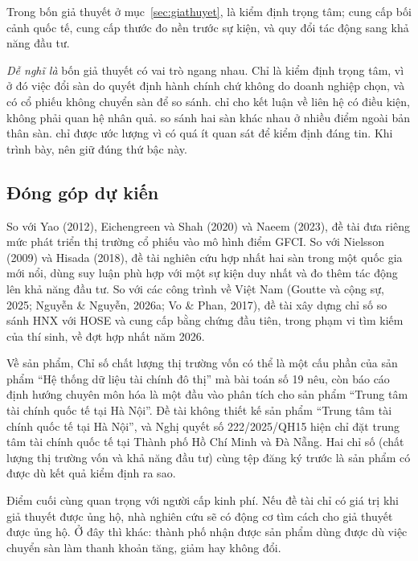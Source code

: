 Trong bốn giả thuyết ở mục~\ref{sec:giathuyet},  là kiểm định trọng tâm;  cung cấp bối cảnh quốc tế,  cung cấp thước đo nền trước sự kiện, và  quy đổi tác động sang khả năng đầu tư.

\begin{delam}
\emph{Dễ nghĩ là} bốn giả thuyết có vai trò ngang nhau. Chỉ  là kiểm định trọng tâm, vì ở đó việc đổi sàn do quyết định hành chính chứ không do doanh nghiệp chọn, và có cổ phiếu không chuyển sàn để so sánh.  chỉ cho kết luận về liên hệ có điều kiện, không phải quan hệ nhân quả.  so sánh hai sàn khác nhau ở nhiều điểm ngoài bản thân sàn.  chỉ được ước lượng vì có quá ít quan sát để kiểm định đáng tin. Khi trình bày, nên giữ đúng thứ bậc này.
\end{delam}

\subsection*{Đóng góp dự kiến}

So với Yao (2012), Eichengreen và Shah (2020) và Naeem (2023), đề tài đưa riêng mức phát triển thị trường cổ phiếu vào mô hình điểm GFCI. So với Nielsson (2009) và Hisada (2018), đề tài nghiên cứu hợp nhất hai sàn trong một quốc gia mới nổi, dùng suy luận phù hợp với một sự kiện duy nhất và đo thêm tác động lên khả năng đầu tư. So với các công trình về Việt Nam (Goutte và cộng sự, 2025; Nguyễn \& Nguyễn, 2026a; Vo \& Phan, 2017), đề tài xây dựng chỉ số so sánh HNX với HOSE và cung cấp bằng chứng đầu tiên, trong phạm vi tìm kiếm của thí sinh, về đợt hợp nhất năm 2026.

Về sản phẩm, Chỉ số chất lượng thị trường vốn có thể là một cấu phần của sản phẩm \enquote{Hệ thống dữ liệu tài chính đô thị} mà bài toán số 19 nêu, còn báo cáo định hướng chuyên môn hóa là một đầu vào phân tích cho sản phẩm \enquote{Trung tâm tài chính quốc tế tại Hà Nội}. Đề tài không thiết kế sản phẩm \enquote{Trung tâm tài chính quốc tế tại Hà Nội}, và Nghị quyết số 222/2025/QH15 hiện chỉ đặt trung tâm tài chính quốc tế tại Thành phố Hồ Chí Minh và Đà Nẵng. Hai chỉ số (chất lượng thị trường vốn và khả năng đầu tư) cùng tệp đăng ký trước là sản phẩm có được dù kết quả kiểm định ra sao.

Điểm cuối cùng quan trọng với người cấp kinh phí. Nếu đề tài chỉ có giá trị khi giả thuyết được ủng hộ, nhà nghiên cứu sẽ có động cơ tìm cách cho giả thuyết được ủng hộ. Ở đây thì khác: thành phố nhận được sản phẩm dùng được dù việc chuyển sàn làm thanh khoản tăng, giảm hay không đổi.

